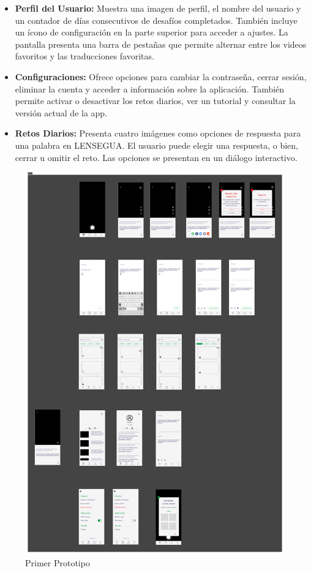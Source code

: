 \begin{itemize}
\begin{itemize}
        \item \textbf{Perfil del Usuario:} Muestra una imagen de perfil, el nombre del usuario y un contador de días consecutivos de desafíos completados. También incluye un ícono de configuración en la parte superior para acceder a ajustes. La pantalla presenta una barra de pestañas que permite alternar entre los videos favoritos y las traducciones favoritas.
        
        \item \textbf{Configuraciones:} Ofrece opciones para cambiar la contraseña, cerrar sesión, eliminar la cuenta y acceder a información sobre la aplicación. También permite activar o desactivar los retos diarios, ver un tutorial y consultar la versión actual de la app.
        
        \item \textbf{Retos Diarios:} Presenta cuatro imágenes como opciones de respuesta para una palabra en LENSEGUA. El usuario puede elegir una respuesta, o bien, cerrar u omitir el reto. Las opciones se presentan en un diálogo interactivo.
    \end{itemize}
    
    \begin{figure} [H]
        \centering
        \includegraphics[width=1\linewidth]{figuras/Prototipo1.png}
        \caption{Primer Prototipo}
        \label{fig:enter-label}
    \end{figure}


\end{itemize}
